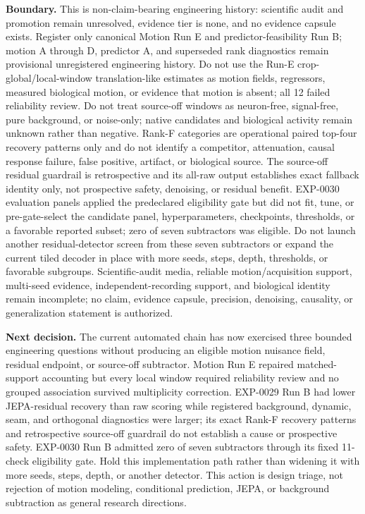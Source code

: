 \textbf{Boundary.} This is non-claim-bearing engineering history: scientific audit and promotion remain unresolved, evidence tier is none, and no evidence capsule exists. Register only canonical Motion Run E and predictor-feasibility Run B; motion A through D, predictor A, and superseded rank diagnostics remain provisional unregistered engineering history. Do not use the Run-E crop-global/local-window translation-like estimates as motion fields, regressors, measured biological motion, or evidence that motion is absent; all 12 failed reliability review. Do not treat source-off windows as neuron-free, signal-free, pure background, or noise-only; native candidates and biological activity remain unknown rather than negative. Rank-F categories are operational paired top-four recovery patterns only and do not identify a competitor, attenuation, causal response failure, false positive, artifact, or biological source. The source-off residual guardrail is retrospective and its all-raw output establishes exact fallback identity only, not prospective safety, denoising, or residual benefit. EXP-0030 evaluation panels applied the predeclared eligibility gate but did not fit, tune, or pre-gate-select the candidate panel, hyperparameters, checkpoints, thresholds, or a favorable reported subset; zero of seven subtractors was eligible. Do not launch another residual-detector screen from these seven subtractors or expand the current tiled decoder in place with more seeds, steps, depth, thresholds, or favorable subgroups. Scientific-audit media, reliable motion/acquisition support, multi-seed evidence, independent-recording support, and biological identity remain incomplete; no claim, evidence capsule, precision, denoising, causality, or generalization statement is authorized.

\textbf{Next decision.} The current automated chain has now exercised three bounded engineering questions without producing an eligible motion nuisance field, residual endpoint, or source-off subtractor. Motion Run E repaired matched-support accounting but every local window required reliability review and no grouped association survived multiplicity correction. EXP-0029 Run B had lower JEPA-residual recovery than raw scoring while registered background, dynamic, seam, and orthogonal diagnostics were larger; its exact Rank-F recovery patterns and retrospective source-off guardrail do not establish a cause or prospective safety. EXP-0030 Run B admitted zero of seven subtractors through its fixed 11-check eligibility gate. Hold this implementation path rather than widening it with more seeds, steps, depth, or another detector. This action is design triage, not rejection of motion modeling, conditional prediction, JEPA, or background subtraction as general research directions.

